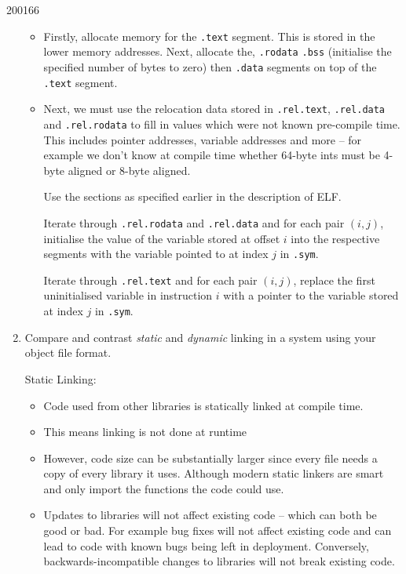 \documentclass[10pt,\jkfside,a4paper]{article}
\begin{document}
\begin{examquestion}{2001}{6}{6}
\begin{enumerate}
\begin{itemize}

\item Firstly, allocate memory for the \texttt{.text} segment. This is
stored in the lower memory addresses. Next, allocate the, \texttt{.rodata}
\texttt{.bss} (initialise the specified number of bytes to zero) then
\texttt{.data} segments on top of the \texttt{.text} segment.

\item Next, we must use the relocation data stored in
\texttt{.rel.text}, \texttt{.rel.data} and \texttt{.rel.rodata} to fill in
values which were not known pre-compile time. This includes pointer
addresses, variable addresses and more -- for example we don't know at
compile time whether 64-byte ints must be 4-byte aligned or 8-byte aligned.

Use the sections as specified earlier in the description of ELF\@.

Iterate through \texttt{.rel.rodata} and \texttt{.rel.data} and for each
pair $(i, j)$, initialise the value of the variable stored at offset $i$
into the respective segments with the variable pointed to at index $j$ in
\texttt{.sym}.

Iterate through \texttt{.rel.text} and for each pair $(i, j)$, replace the
first uninitialised variable in instruction $i$ with a pointer to the
variable stored at index $j$ in \texttt{.sym}.

\end{itemize}

\item Compare and contrast \textit{static} and \textit{dynamic} linking in a
system using your object file format.

Static Linking:

\begin{itemize}

\item Code used from other libraries is statically linked at compile time.

\item This means linking is not done at runtime

\item However, code size can be substantially larger since every file needs
a copy of every library it uses. Although modern static linkers are smart
and only import the functions the code could use.

\item Updates to libraries will not affect existing code -- which can both
be good or bad. For example bug fixes will not affect existing code and can
lead to code with known bugs being left in deployment. Conversely,
backwards-incompatible changes to libraries will not break existing code.


\end{itemize}
\end{enumerate}
\end{examquestion}
\end{document}
